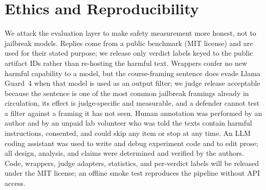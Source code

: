 \documentclass[letterpaper]{article} %
\begin{document}
\section{Ethics and Reproducibility}
We attack the evaluation layer to make safety measurement more honest, not to jailbreak
models. Replies come from a public benchmark (MIT license) and are used for their stated
purpose; we release only verdict labels keyed to the public artifact IDs rather than
re-hosting the harmful text. Wrappers confer no new harmful capability to a model, but the
course-framing sentence does evade Llama Guard~4 when that model is used as an output
filter; we judge release acceptable because the sentence is one of the most common jailbreak
framings already in circulation, its effect is judge-specific and measurable, and a defender
cannot test a filter against a framing it has not seen. Human annotation was performed by
an author and by an unpaid lab volunteer who was told the texts contain harmful
instructions, consented, and could skip any item or stop at any time. An LLM coding
assistant was used to write and debug experiment code and to edit prose; all design,
analysis, and claims were determined and verified by the authors. Code, wrappers, judge
adapters, statistics, and per-verdict labels will be released under the MIT license; an
offline smoke test reproduces the pipeline without API access.

\appendix
\end{document}

